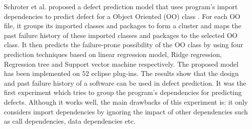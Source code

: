 \documentclass[12pt]{report}
\begin{document}

Schroter et al. proposed a defect prediction model that uses program's import dependencies to predict defect for a Object Oriented (OO) class \cite{schroter2006predicting}. For each OO file, it groups its imported classes and packages to form a cluster and maps the past failure history of these imported classes and packages to the selected OO class. It then predicts the failure-prone possibility of the OO class by using four prediction techniques based on linear regression model, Ridge regression, Regression tree and Support vector machine respectively. The proposed model has been implemented on $52$ eclipse plug-ins. The results show that the design and past failure history of a software can be used in defect prediction. It was the first experiment which tries to group the program's dependencies for predicting defects. Although it works well, the main drawbacks of this experiment is: it only considers import dependencies by ignoring the impact of other dependencies such as call dependencies, data dependencies etc. 
\end{document}
